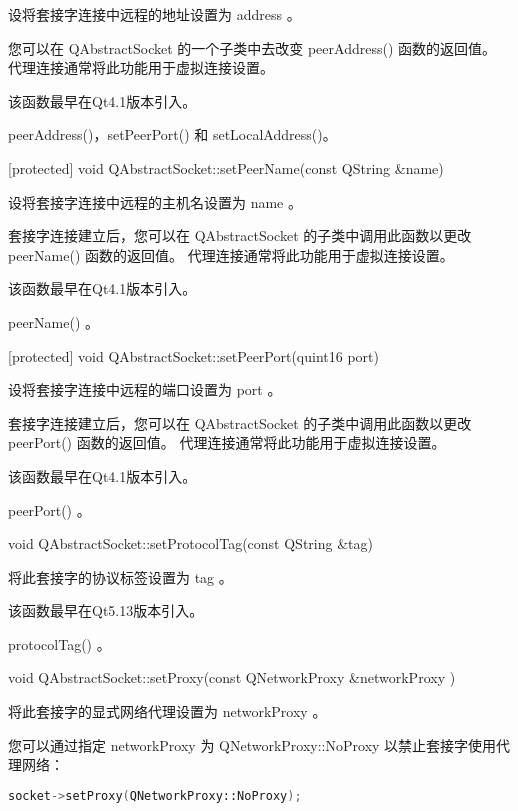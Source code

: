 设将套接字连接中远程的地址设置为 address 。

您可以在 QAbstractSocket 的一个子类中去改变 peerAddress() 函数的返回值。 代理连接通常将此功能用于虚拟连接设置。

该函数最早在Qt4.1版本引入。

\begin{seeAlso}
peerAddress()，setPeerPort() 和 setLocalAddress()。
\end{seeAlso}

[protected] void QAbstractSocket::setPeerName(const QString \&name)

设将套接字连接中远程的主机名设置为 name 。

套接字连接建立后，您可以在 QAbstractSocket 的子类中调用此函数以更改 peerName() 函数的返回值。 代理连接通常将此功能用于虚拟连接设置。

该函数最早在Qt4.1版本引入。


\begin{seeAlso}
 peerName() 。
\end{seeAlso}

[protected] void QAbstractSocket::setPeerPort(quint16 port)

设将套接字连接中远程的端口设置为 port 。

套接字连接建立后，您可以在 QAbstractSocket 的子类中调用此函数以更改 peerPort() 函数的返回值。 代理连接通常将此功能用于虚拟连接设置。

该函数最早在Qt4.1版本引入。


\begin{seeAlso}
peerPort() 。
\end{seeAlso}

void QAbstractSocket::setProtocolTag(const QString \&tag)

将此套接字的协议标签设置为 tag 。

该函数最早在Qt5.13版本引入。


\begin{seeAlso}
protocolTag() 。
\end{seeAlso}

void QAbstractSocket::setProxy(const QNetworkProxy \&networkProxy )

将此套接字的显式网络代理设置为 networkProxy 。

您可以通过指定 networkProxy 为 QNetworkProxy::NoProxy 以禁止套接字使用代理网络：


\begin{lstlisting}[language=C++]
socket->setProxy(QNetworkProxy::NoProxy);
\end{lstlisting}


